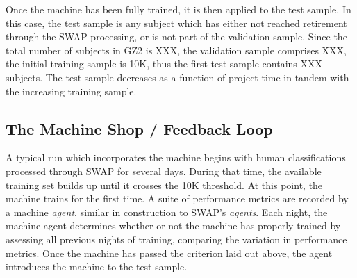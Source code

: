 \documentclass[twocolumn]{aastex6}
\begin{document}

Once the machine has been fully trained, it is then applied to the test sample. 
In this case, the test sample is any subject which has either not reached retirement
through the SWAP processing, or is not part of the validation sample. Since the 
total number of subjects in GZ2 is XXX, the validation sample comprises XXX, 
the initial training sample is 10K, thus the first test sample contains XXX subjects. 
The test sample decreases as a function of project time in tandem with the increasing
training sample. 


\subsection{The Machine Shop / Feedback Loop}
A typical run which incorporates the machine begins with human classifications 
processed through SWAP for several days. During that time, the available training set
builds up until it crosses the 10K threshold. At this point, the machine trains for the 
first time. A suite of performance metrics are recorded by a machine \textit{agent}, similar
in construction to SWAP's \textit{agents}. Each night, the machine agent determines 
whether or not the machine has properly trained by assessing all previous nights of 
training, comparing the variation in performance metrics. Once the machine has
passed the criterion laid out above, the agent introduces the machine to the test sample.
\end{document}
